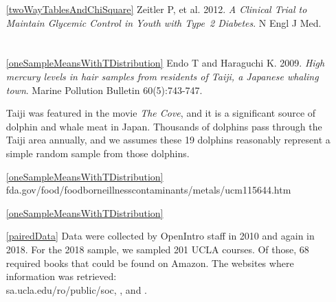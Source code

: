 \begin{itemize}
\item[\ref{twoWayTablesAndChiSquare}]
    Zeitler P, et al. 2012.
    \emph{A Clinical Trial to Maintain Glycemic Control
    in Youth with Type~2 Diabetes}.
    N Engl J Med.

\end{itemize}






\section{}
\label{ch_inference_for_means_data}

\begin{itemize}
\setlength{\itemsep}{0mm}
\item[\ref{oneSampleMeansWithTDistribution}]
    Endo T and Haraguchi K. 2009.
    \emph{High mercury levels in hair samples from
    residents of Taiji, a Japanese whaling town}.
    Marine Pollution Bulletin 60(5):743-747.

    Taiji was featured in the movie
    \emph{The Cove}, and it is a significant source of dolphin
    and whale meat in Japan.
    Thousands of dolphins pass through the Taiji area annually,
    and we assumes these 19 dolphins reasonably represent
    a simple random sample from those dolphins.
\item[\ref{oneSampleMeansWithTDistribution}]
        {fda.gov/food/foodborneillnesscontaminants/metals/ucm115644.htm}
\item[\ref{oneSampleMeansWithTDistribution}]

\item[\ref{pairedData}]
    Data were collected by OpenIntro staff in 2010 and again
    in 2018.
    For the 2018 sample, we sampled 201 UCLA courses.
    Of those, 68 required books that could be
    found on Amazon.
    The websites where information was retrieved: \\
        {sa.ucla.edu/ro/public/soc},
    ,
    and .


\end{itemize}
